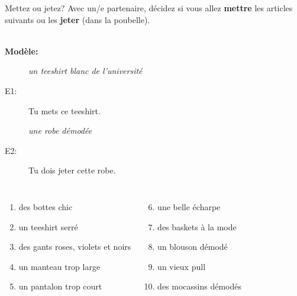 \documentclass{beamer}
\begin{document}
  \begin{frame}{Mettez ou jetez?}
    Avec un/e partenaire, décidez si vous allez \textbf{mettre} les articles suivants ou les \textbf{jeter} (dans la poubelle). \\
     \\
    \begin{description}
      \item[\textbf{Modèle:}] \emph{un teeshirt blanc de l'université}
      \item[E1:] Tu mets ce teeshirt.
      \item[] 
      \item[] \emph{une robe démodée}
      \item[E2:] Tu dois jeter cette robe.
      \item[] 
    \end{description}
    \begin{columns}
        \begin{enumerate}
          \item des bottes chic
          \item un teeshirt serré
          \item des gants roses, violets et noirs
          \item un manteau trop large
          \item un pantalon trop court
        \end{enumerate}
        \begin{enumerate}
          \setcounter{enumi}{5}
          \item une belle écharpe
          \item des baskets à la mode
          \item un blouson démodé
          \item un vieux pull
          \item des mocassins démodés
        \end{enumerate}
    \end{columns}
  \end{frame}
\end{document}

